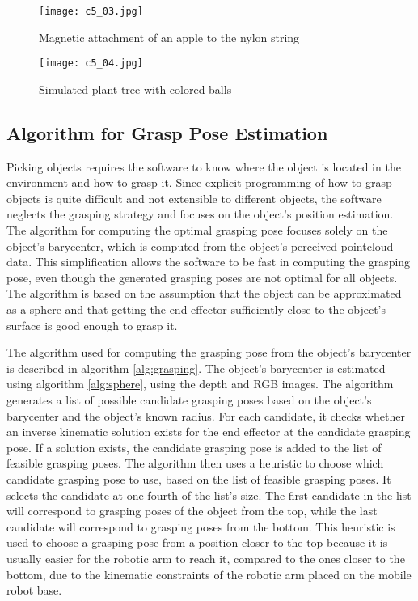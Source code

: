 \begin{figure}[t]
    \centering
    \texttt{[image: c5\_03.jpg]}
    \caption{Magnetic attachment of an apple to the nylon string}
    \label{fig:magnetic}
\end{figure}

\begin{figure}[t]
    \centering
    \texttt{[image: c5\_04.jpg]}
    \caption{Simulated plant tree with colored balls}
    \label{fig:sim_plant}
\end{figure}

\subsection{Algorithm for Grasp Pose Estimation}

Picking objects requires the software to know where the object is located in the environment and how to grasp it.
Since explicit programming of how to grasp objects is quite difficult and not extensible to different objects,
the software neglects the grasping strategy and focuses on the object's position estimation. The algorithm for
computing the optimal grasping pose focuses solely on the object's barycenter, which is computed from the object's
perceived pointcloud data. This simplification allows the software to be fast in computing the grasping pose,
even though the generated grasping poses are not optimal for all objects. The algorithm is based on the assumption
that the object can be approximated as a sphere and that getting the end effector sufficiently close to the
object's surface is good enough to grasp it.

The algorithm used for computing the grasping pose from the object's barycenter is described
in algorithm \ref{alg:grasping}. The object's barycenter is estimated using algorithm \ref{alg:sphere},
using the depth and RGB images. The algorithm generates a list of possible candidate grasping poses
based on the object's barycenter and the object's known radius. For each candidate, it checks whether 
an inverse kinematic solution exists for the end effector at the candidate grasping pose. 
If a solution exists, the candidate grasping pose is added to the list of feasible grasping poses.
The algorithm then uses a heuristic to choose which candidate grasping pose to use, based on the list
of feasible grasping poses. It selects the candidate at one fourth of the list's size. The first candidate in the 
list will correspond to grasping poses of the object from the top, while the last candidate will correspond
to grasping poses from the bottom. This heuristic is used to choose a grasping pose from a position closer to 
the top because it is usually easier for the robotic arm to reach it, compared to the ones closer to the bottom,
due to the kinematic constraints of the robotic arm placed on the mobile robot base.


